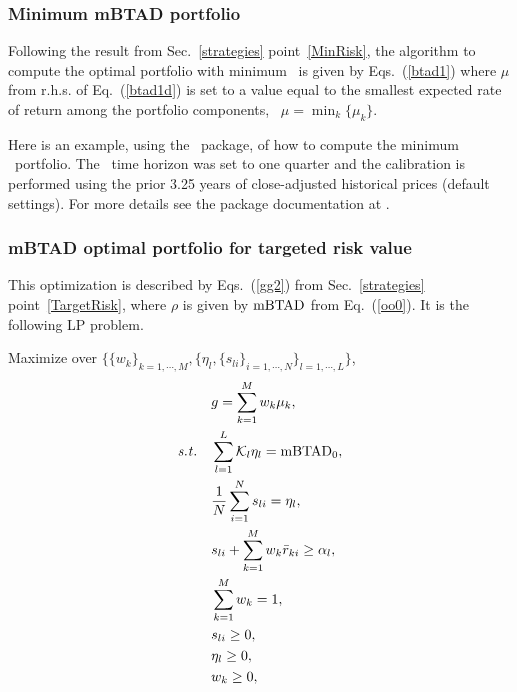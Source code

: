 \subsubsection{Minimum mBTAD portfolio}

Following the result from Sec.~\ref{strategies} point~\ref{MinRisk},
the algorithm to compute the optimal portfolio with minimum \mBTAD\ is given by Eqs.~(\ref{btad1}) where
$\mu$ from r.h.s. of Eq.~(\ref{btad1d}) is set to a value equal to the smallest expected rate of
return among the portfolio components, \ie\ $\mu=\min_k\{\mu_k\}$.

\bigskip
\noindent Here is an example, using the \azapy\ package, of how to compute the minimum \mBTAD\ portfolio.
The \mBTAD\ time horizon was set to one quarter and the calibration is performed using the prior 3.25 years of
close-adjusted historical prices (default settings).
For more details see the package documentation at \azapydoc.



\BackToContents

\subsubsection{mBTAD optimal portfolio for targeted risk value}
This optimization is described by Eqs.~(\ref{gg2}) from Sec.~\ref{strategies} point~\ref{TargetRisk},
where $\rho$ is given by ${\rm mBTAD}$ from Eq.\ (\ref{oo0}).
It is the following LP problem.

\bigskip
\noindent Maximize over $\{\{w_k\}_{k=1,\cdots,M}, \{ \eta_l, \{ s_{li} \}_{i=1,\cdots,N} \}_{l=1,\cdots,L} \}$,
\begin{subequations}\label{btad3}
\begin{align}
    &g = \sum_{k=1}^M w_k \mu_k, \label{btad3a} \\
    \st &\sum_{l=1}^L \cK_l \eta_l = \mBTAD_0, \label{btad3b} \\
    & \frac{1}{N} \sum_{i=1}^N s_{li} = \eta_l, \label{btad3c} \\
    & s_{li} + \sum_{k=1}^M w_k \br_{ki} \geq \alpha_l, \label{btad3d} \\
    & \sum_{k=1}^M w_k = 1, \label{btad3e} \\
    & s_{li} \geq 0, \label{btad3g} \\
    & \eta_l \geq 0, \label{btad3h} \\
    & w_k \geq 0, \label{btad3f}
\end{align}
\end{subequations}


